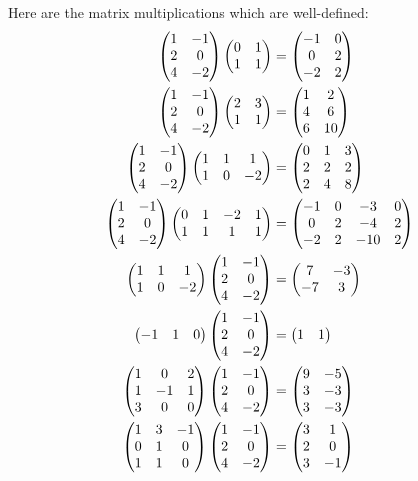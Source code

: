 \documentclass{article}
\begin{document}
\begin{Solution}
\end{Solution}
\begin{Solution}\label{sol:exr:matmul}
Here are the matrix multiplications which are well-defined:
\begin{align*}
\ma 1 & -1 \\ 2 & 0 \\ 4 & -2 \mz\ma 0 & 1 \\ 1 & 1 \mz&=\ma -1 & 0 \\ 0 & 2 \\ -2 & 2\mz\\
\ma 1 & -1 \\ 2 & 0 \\ 4 & -2 \mz\ma 2 & 3 \\ 1 & 1 \mz&=\ma 1 & 2 \\ 4 & 6 \\ 6 & 10 \mz\\
\ma 1 & -1 \\ 2 & 0 \\ 4 & -2 \mz\ma 1 & 1 & 1 \\ 1 & 0 & -2 \mz&=\ma 0 & 1 & 3 \\ 2 & 2 & 2 \\ 2 & 4 & 8\mz\\
\ma 1 & -1 \\ 2 & 0 \\ 4 & -2 \mz\ma 0 & 1 & -2 & 1 \\ 1 & 1 & 1 & 1 \mz&=\ma -1 & 0 & -3 & 0 \\ 0 & 2 & -4 & 2 \\ -2 & 2 & -10 & 2\mz\\
\ma 1 & 1 & 1 \\ 1 & 0 & -2 \mz\ma 1 & -1 \\ 2 & 0 \\ 4 & -2 \mz&=\ma 7 & -3 \\ -7 & 3\mz\\
\ma -1 & 1 & 0\mz\ma 1 & -1 \\ 2 & 0 \\ 4 & -2 \mz&=\ma 1 & 1 \mz\\
\ma 1 & 0 & 2 \\ 1 & -1 & 1 \\ 3 & 0 & 0\mz\ma 1 & -1 \\ 2 & 0 \\ 4 & -2 \mz&=\ma 9 & -5 \\ 3 & -3 \\ 3 & -3\mz\\
\ma 1 & 3 & -1 \\ 0 & 1 & 0 \\ 1 & 1 & 0\mz\ma 1 & -1 \\ 2 & 0 \\ 4 & -2 \mz&=\ma 3 & 1 \\ 2 & 0 \\ 3 & -1\mz
\end{align*}


\end{Solution}
\end{document}
